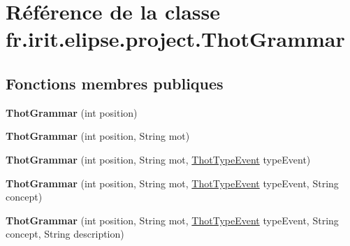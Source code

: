 \hypertarget{classfr_1_1irit_1_1elipse_1_1project_1_1_thot_grammar}{}\section{Référence de la classe fr.\+irit.\+elipse.\+project.\+Thot\+Grammar}
\label{classfr_1_1irit_1_1elipse_1_1project_1_1_thot_grammar}
\subsection*{Fonctions membres publiques}
\begin{DoxyCompactItemize}
\item 
\mbox{\label{classfr_1_1irit_1_1elipse_1_1project_1_1_thot_grammar_a0613f0489d221488998d1bfdc153b99d}} 
{\bfseries Thot\+Grammar} (int position)
\item 
\mbox{\label{classfr_1_1irit_1_1elipse_1_1project_1_1_thot_grammar_a4b5401b637035fb1f20559834d8fd34c}} 
{\bfseries Thot\+Grammar} (int position, String mot)
\item 
\mbox{\label{classfr_1_1irit_1_1elipse_1_1project_1_1_thot_grammar_a26727d472abbe9b175cf483de30365bc}} 
{\bfseries Thot\+Grammar} (int position, String mot, \mbox{\hyperlink{enumfr_1_1irit_1_1elipse_1_1project_1_1_thot_type_event}{Thot\+Type\+Event}} type\+Event)
\item 
\mbox{\label{classfr_1_1irit_1_1elipse_1_1project_1_1_thot_grammar_a0ac06445641e90422ab311b220b7cba0}} 
{\bfseries Thot\+Grammar} (int position, String mot, \mbox{\hyperlink{enumfr_1_1irit_1_1elipse_1_1project_1_1_thot_type_event}{Thot\+Type\+Event}} type\+Event, String concept)
\item 
\mbox{\label{classfr_1_1irit_1_1elipse_1_1project_1_1_thot_grammar_a36d89c79c697a0d329d765353f5572cb}} 
{\bfseries Thot\+Grammar} (int position, String mot, \mbox{\hyperlink{enumfr_1_1irit_1_1elipse_1_1project_1_1_thot_type_event}{Thot\+Type\+Event}} type\+Event, String concept, String description)

\end{DoxyCompactItemize}

